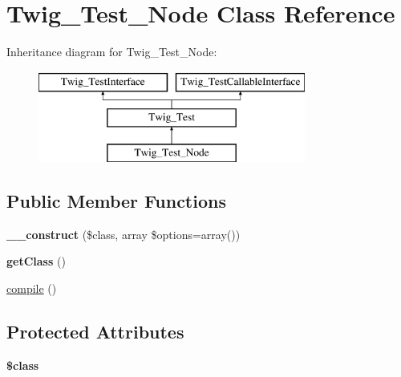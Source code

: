 \hypertarget{classTwig__Test__Node}{}\section{Twig\+\_\+\+Test\+\_\+\+Node Class Reference}
\label{classTwig__Test__Node}
Inheritance diagram for Twig\+\_\+\+Test\+\_\+\+Node\+:\begin{figure}[H]
\begin{center}
\leavevmode
\includegraphics[height=3.000000cm]{classTwig__Test__Node}
\end{center}
\end{figure}
\subsection*{Public Member Functions}
\begin{DoxyCompactItemize}
\item 
{\bfseries \+\_\+\+\_\+construct} (\$class, array \$options=array())\hypertarget{classTwig__Test__Node_a7e4c20045cb3034495759cdeafd5c161}{}\label{classTwig__Test__Node_a7e4c20045cb3034495759cdeafd5c161}

\item 
{\bfseries get\+Class} ()\hypertarget{classTwig__Test__Node_a47c3dbcff776a3585bf2396493b164e4}{}\label{classTwig__Test__Node_a47c3dbcff776a3585bf2396493b164e4}

\item 
\hyperlink{classTwig__Test__Node_a3a752692afc39a11975ac2e83077c9ee}{compile} ()
\end{DoxyCompactItemize}
\subsection*{Protected Attributes}
\begin{DoxyCompactItemize}
\item 
{\bfseries \$class}\hypertarget{classTwig__Test__Node_a8ea572e398e5e3af21af110489a0a7e9}{}\label{classTwig__Test__Node_a8ea572e398e5e3af21af110489a0a7e9}

\end{DoxyCompactItemize}


